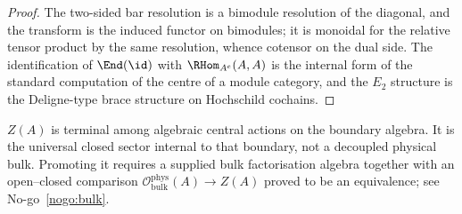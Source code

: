 \begin{proof}
The two-sided bar resolution is a bimodule resolution of the diagonal, and
the transform is the induced functor on bimodules; it is monoidal for the
relative tensor product by the same resolution, whence cotensor on the
dual side. The identification of $\End(\id)$ with $\RHom_{A^e}(A,A)$ is
the internal form of the standard computation of the centre of a module
category, and the $E_2$ structure is the Deligne-type brace structure on
Hochschild cochains.
\end{proof}

\begin{remark}
\label{rem:centre-not-bulk}
$Z(A)$ is terminal among algebraic central actions on the boundary
algebra. It is the universal closed sector internal to that boundary, not
a decoupled physical bulk. Promoting it requires a supplied bulk
factorisation algebra together with an open--closed comparison
$\mathcal O^{\mathrm{phys}}_{\mathrm{bulk}}(A)\to Z(A)$ proved to be an
equivalence; see No-go~\ref{nogo:bulk}.
\end{remark}
